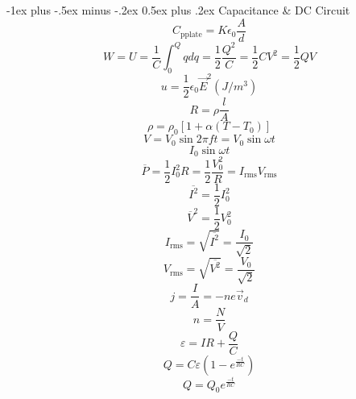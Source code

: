 \documentclass[12pt,landscape]{article}
\makeatletter
\renewcommand{\section}{\@startsection{section}{1}{0mm}%
                                {-1ex plus -.5ex minus -.2ex}%
                                {0.5ex plus .2ex}%
                                {\normalfont\large\bfseries}}
\makeatother
\begin{document}
\begin{multicols}{3}
\section{Capacitance \& DC Circuit}
\begin{equation*}
    C_{\text{pplate}} = K \epsilon_0 \frac{A}{d}
\end{equation*}
\begin{equation*}
    W = U = \frac{1}{C} \int_{0}^{Q} q dq = \frac{1}{2}\frac{Q^2}{C} = \frac{1}{2} CV^2 = \frac{1}{2}QV
\end{equation*}
\begin{equation*}
    u = \frac{1}{2} \epsilon_0 \vec{E}^2 (J / m^3)
\end{equation*}
\begin{equation*}
    R = \rho \frac{l}{A}
\end{equation*}
\begin{equation*}
    \rho = \rho_0 [1 + \alpha(T - T_0)]
\end{equation*}
\begin{equation*}
    V = V_0 \sin{2\pi f} t = V_0 \sin{\omega t}
\end{equation*}
\begin{equation*}
    I_0 \sin{\omega t}
\end{equation*}
\begin{equation*}
    \overbar{P} = \frac{1}{2} I_0^2 R = \frac{1}{2} \frac{V_0^2}{R}= I_{\text{rms}} V_{\text{rms}}
\end{equation*}
\begin{equation*}
    \overbar{I^2} = \frac{1}{2} I_0^2
\end{equation*}
\begin{equation*}
    \overbar{V}^2 = \frac{1}{2} V_0^2
\end{equation*}
\begin{equation*}
    I_{\text{rms}} = \sqrt{\overbar{I^2}} = \frac{I_0}{\sqrt{2}}
\end{equation*}
\begin{equation*}
    V_{\text{rms}} = \sqrt{\overbar{V^2}} = \frac{V_0}{\sqrt{2}}
\end{equation*}
\begin{equation*}
    j = \frac{I}{A} = -n e \vec{v}_d 
\end{equation*}
\begin{equation*}
    n = \frac{N}{V}
\end{equation*}
\begin{equation*}
    \varepsilon = IR + \frac{Q}{C}
\end{equation*}
\begin{equation*}
    Q = C\varepsilon \left(1 - e^{\frac{-t}{RC}} \right)
\end{equation*}
\begin{equation*}
    Q = Q_0 e^{\frac{-t}{RC}}
\end{equation*}


\end{multicols}
\end{document}
